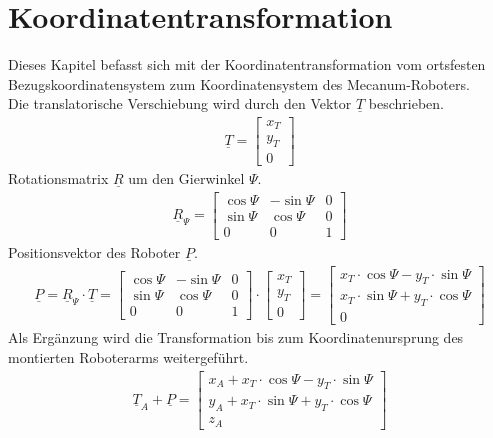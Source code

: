 \documentclass[a4paper]{article}
\begin{document}
\section{Koordinatentransformation}
Dieses Kapitel befasst sich mit der Koordinatentransformation vom ortsfesten Bezugskoordinatensystem zum Koordinatensystem des Mecanum-Roboters. \\
Die translatorische Verschiebung wird durch den Vektor $\underline T$ beschrieben.
\begin{align*}
\underline T =
\begin{bmatrix}
x_{T}\\
y_{T}\\
0
\end{bmatrix}
\end{align*}
Rotationsmatrix $\underline R$ um den Gierwinkel $\Psi$.
\begin{align*}
 \underline R_{\Psi} =
\begin{bmatrix}
  \cos{\Psi} & -\sin{\Psi} & 0\\
  \sin{\Psi} & \cos{\Psi} & 0\\
  0 & 0 & 1
\end{bmatrix}
\end{align*}
Positionsvektor des Roboter $\underline P$.
\begin{align*}
\underline P = \underline R_{\Psi} \cdot \underline T =
\begin{bmatrix}
  \cos{\Psi} & -\sin{\Psi} & 0\\
  \sin{\Psi} & \cos{\Psi} & 0\\
  0 & 0 & 1
\end{bmatrix}\cdot
\begin{bmatrix}
x_{T}\\
y_{T}\\
0
\end{bmatrix}=
\begin{bmatrix}
x_{T} \cdot \cos{\Psi}-y_{T} \cdot \sin{\Psi}\\
x_{T} \cdot \sin{\Psi}+y_{T}  \cdot \cos{\Psi}\\
0
\end{bmatrix}
\end{align*}
Als Ergänzung wird die Transformation bis zum Koordinatenursprung des montierten Roboterarms weitergeführt.
\begin{align*}
\underline T_{A} + \underline P =
\begin{bmatrix}
x_{A} + x_{T} \cdot \cos{\Psi}-y_{T} \cdot \sin{\Psi}\\
y_{A} + x_{T} \cdot \sin{\Psi}+y_{T}  \cdot \cos{\Psi}\\
z_{A}
\end{bmatrix}
\end{align*}
\end{document}
